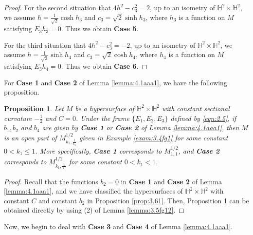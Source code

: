 \documentclass[reqno]{amsart}%
\newtheorem{proposition}[theorem]{Proposition}
\theoremstyle{definition}
\numberwithin{equation}{section}
\begin{document}
\begin{proof}
For the second situation that $4h^2-c_3^2=2$, up to an isometry of $\mathbb{H}^2\times \mathbb{H}^2$,
we assume $h=\frac{1}{\sqrt{2}}\cosh h_3$ and $c_3=\sqrt{2}\sinh h_3$, where $h_3$ is a function on $M$ satisfying $E_3h_3=0$. Thus we obtain {\bf Case 5}.

For the third situation that $4h^2-c_3^2=-2$, up to an isometry of $\mathbb{H}^2\times \mathbb{H}^2$,
we assume $h=\frac{1}{\sqrt{2}}\sinh h_4$ and $c_3=\sqrt{2}\cosh h_4$, where $h_4$ is a function on $M$ satisfying $E_3h_4=0$. Thus we obtain {\bf Case 6}.
\end{proof}

For {\bf Case 1} and {\bf Case 2} of Lemma \ref{lemma:4.1aaa1}, we have the following proposition.

\begin{proposition}\label{prop:4.1a1}
Let $M$ be a hypersurface of $\mathbb{H}^2\times \mathbb{H}^2$ with constant sectional curvature $-\frac{1}{2}$ and $C=0$.
Under the frame $\{E_1,E_2,E_3\}$ defined by \eqref{eqn:2.5}, if $b_1,b_2$ and $b_4$ are
given by {\bf Case 1} or {\bf Case 2} of Lemma \ref{lemma:4.1aaa1}, then
$M$ is an open part of $M_{k_1,\frac{1}{k_1}}^{1/2}$ given in Example \ref{exam:3.4fg1} for some constant $0<k_1\leq1$.
More specifically, {\bf Case 1} corresponds to $M_{1,1}^{1/2}$, and
{\bf Case 2} corresponds to $M_{k_1,\frac{1}{k_1}}^{1/2}$ for some constant $0<k_1<1$.
\end{proposition}
%
\begin{proof}
Recall that the functions $b_2=0$ in {\bf Case 1} and {\bf Case 2} of Lemma \ref{lemma:4.1aaa1}, and we have classified the hypersurfaces of $\mathbb{H}^2\times \mathbb{H}^2$ with constant $C$
and constant $b_2$ in Proposition \ref{prop:3.61}. Then, Proposition \ref{prop:4.1a1} can be obtained directly by using (2) of Lemma \ref{lemma:3.5fg12}.
\end{proof}



Now, we begin to deal with {\bf Case 3} and {\bf Case 4} of Lemma \ref{lemma:4.1aaa1}.
\end{document}
